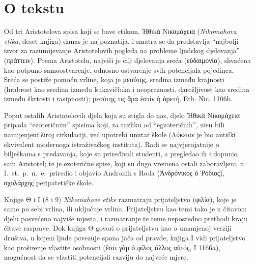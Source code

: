 


\section*{O tekstu}

Od tri Aristotelova spisa koji se bave etikom, \textgreek[variant=ancient]{Ἠθικὰ Νικομάχεια} (\textit{Nikomahova etika}, deset knjiga) danas je najpoznatija, i smatra se da predstavlja ``najbolji izvor za razumijevanje Aristotelovih pogleda na probleme ljudskog djelovanja'' \textgreek[variant=ancient]{(πράττειν).} Prema Aristotelu, najviši je cilj djelovanja sreća \textgreek[variant=ancient]{(εὐδαιμονία)}, shvaćena kao potpuno samoostvarenje, odnosno ostvarenje svih potencijala pojedinca. Sreća se postiže pomoću vrline, koja je \textgreek[variant=ancient]{μεσότης,} sredina između krajnosti (hrabrost kao sredina između kukavičluka i neopreznosti, darežljivost kao sredina između škrtosti i rasipnosti); \textgreek[variant=ancient]{μεσότης τις ἄρα ἐστὶν ἡ ἀρετή}, Eth. Nic. 1106b.

Poput ostalih Aristotelovih djela koja su stigla do nas, djelo \textgreek[variant=ancient]{Ἠθικὰ Νικομάχεια} pripada ``ezoteričnim'' spisima koji, za razliku od ``egzoteričnih'', nisu bili namijenjeni široj cirkulaciji, već upotrebi unutar škole \textgreek[variant=ancient]{(Λύκειον} je bio antički ekvivalent modernoga istraživačkog instituta). Radi se najvjerojatnije o bilješkama s predavanja, koje su priređivali studenti, a pregledao ih i dopunio sam Aristotel; te je ezoterične spise, koji su dugo vremena ostali zaboravljeni, u I.~st.\ p.~n.~e.\ priredio i objavio Andronik s Roda \textgreek[variant=ancient]{(Ἀνδρόνικος ὁ Ῥόδιος), σχολάρχης} peripatetičke škole.

Knjige Θ i Ι (8 i 9) \textit{Nikomahove etike} razmatraju prijateljstvo \textgreek[variant=ancient]{(φιλία),} koje je samo po sebi vrlina, ili uključuje vrlinu. Prijateljstvu kao temi tako je u čitavom djelu posvećeno najviše mjesta, i razmatranje te teme neposredno prethodi kraju čitave rasprave. Dok knjiga Θ govori o prijateljstvu kao o umanjenoj verziji društva, u kojem ljude povezuje spona jača od pravde, knjiga Ι vidi prijateljstvo kao proširenje vlastite osobnosti \textgreek[variant=ancient]{(ἔστι γὰρ ὁ φίλος ἄλλος αὐτός,} Ι 1166a), mogućnost da se vlastiti potencijali razviju do najveće mjere.

